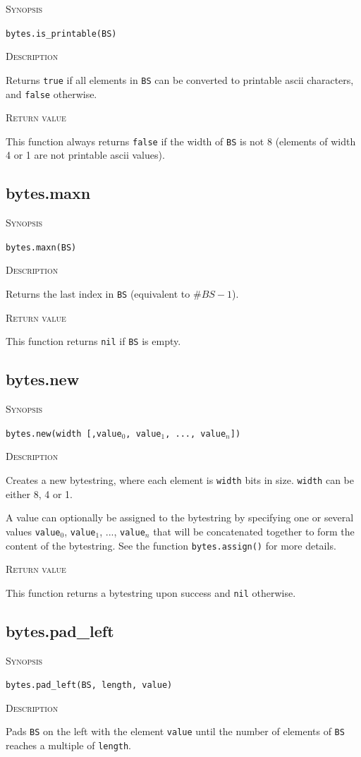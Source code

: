 \documentclass[11pt]{report}
\newcommand{\mansection}[1]{\vspace{0.5em}\par\noindent\textsc{#1}\vspace{0.5em}\par}
\newcommand{\syn}[1]{\texttt{#1}}
\begin{document}
\mansection{Synopsis}
\syn{bytes.is\_printable(BS)}

\mansection{Description}
  Returns \syn{true} if all elements in \syn{BS} can be converted to 
  printable ascii characters, and \syn{false} otherwise.

\mansection{Return value}
  This function always returns \syn{false} if the width of \syn{BS} is 
  not 8 (elements of width 4 or 1 are not printable ascii values).  


\subsection{bytes.maxn}

\mansection{Synopsis}
\syn{bytes.maxn(BS)}

\mansection{Description}
  Returns the last index in \syn{BS} (equivalent to $\#BS-1$).
\mansection{Return value}
  This function returns \syn{nil} if \syn{BS} is empty.


\subsection{bytes.new}

\mansection{Synopsis}
\syn{bytes.new(width [,\syn{value$_0$}, \syn{value$_1$}, ..., \syn{value$_n$}])}

\mansection{Description}
  Creates a new bytestring, where each element is \syn{width} bits in size.
  \syn{width} can be either 8, 4 or 1.

  A value can optionally be assigned to the bytestring by specifying one or 
  several values \syn{value$_0$}, \syn{value$_1$}, ..., \syn{value$_n$} that will be concatenated
  together to form the content of the bytestring. See the function 
  \syn{bytes.assign()} for more details.
\mansection{Return value}
  This function returns a bytestring upon success and \syn{nil} otherwise. 


\subsection{bytes.pad\_left}

\mansection{Synopsis}
\syn{bytes.pad\_left(BS, length, value)}

\mansection{Description}
  Pads \syn{BS} on the left with the element \syn{value} until the number of elements 
  of \syn{BS} reaches a multiple of \syn{length}.
\end{document}
